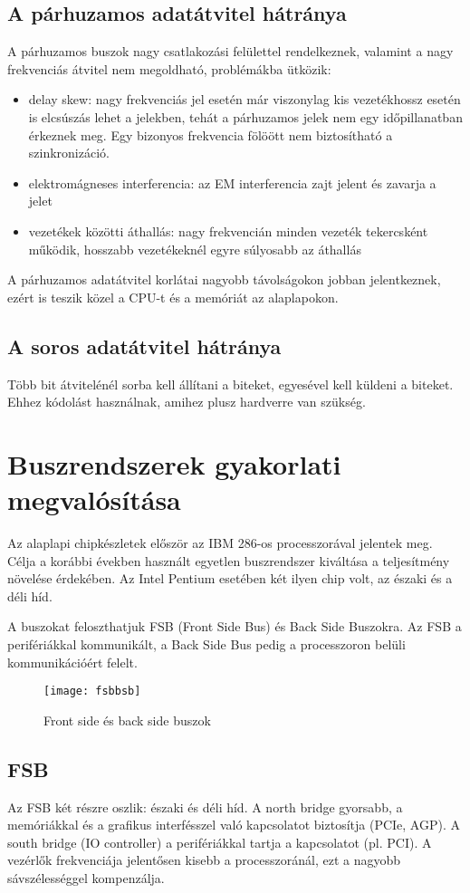 \subsection{A párhuzamos adatátvitel hátránya}
A párhuzamos buszok nagy csatlakozási felülettel rendelkeznek, valamint a nagy frekvenciás átvitel nem megoldható, problémákba ütközik:
\begin{itemize}
    \item delay skew: nagy frekvenciás jel esetén már viszonylag kis vezetékhossz esetén is elcsúszás lehet a jelekben, tehát a párhuzamos jelek nem egy időpillanatban érkeznek meg. Egy bizonyos frekvencia fölöött nem biztosítható a szinkronizáció.
    \item elektromágneses interferencia: az EM interferencia zajt jelent és zavarja a jelet
    \item vezetékek közötti áthallás: nagy frekvencián minden vezeték tekercsként működik, hosszabb vezetékeknél egyre súlyosabb az áthallás
\end{itemize}
A párhuzamos adatátvitel korlátai nagyobb távolságokon jobban jelentkeznek, ezért is teszik közel a CPU-t és a memóriát az alaplapokon.

\subsection{A soros adatátvitel hátránya}
Több bit átvitelénél sorba kell állítani a biteket, egyesével kell küldeni a biteket.
Ehhez kódolást használnak, amihez plusz hardverre van szükség.

\section{Buszrendszerek gyakorlati megvalósítása}
Az alaplapi chipkészletek először az IBM 286-os processzorával jelentek meg.
Célja a korábbi években használt egyetlen buszrendszer kiváltása a teljesítmény növelése érdekében.
Az Intel Pentium esetében két ilyen chip volt, az északi és a déli híd.

A buszokat feloszthatjuk FSB (Front Side Bus) és Back Side Buszokra.
Az FSB a perifériákkal kommunikált, a Back Side Bus pedig a processzoron belüli kommunikációért felelt.
\begin{figure}[H]
    \texttt{[image: fsbbsb]}
    \centering
    \caption{Front side és back side buszok}
    \label{fig:fsbbsb}
\end{figure}

\subsection{FSB}
Az FSB két részre oszlik: északi és déli híd.
A north bridge gyorsabb, a memóriákkal és a grafikus interfésszel való kapcsolatot biztosítja (PCIe, AGP).
A south bridge (IO controller) a perifériákkal tartja a kapcsolatot (pl. PCI).
A vezérlők frekvenciája jelentősen kisebb a processzoránál, ezt a nagyobb sávszélességgel kompenzálja.

